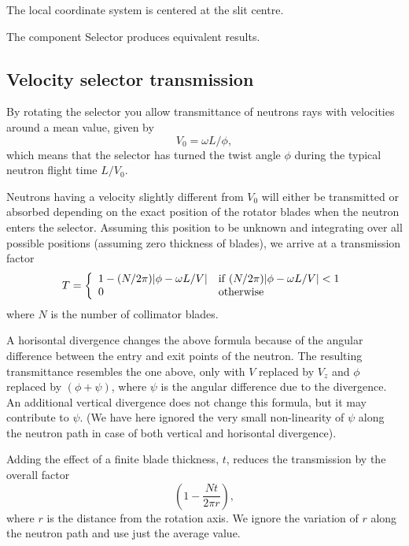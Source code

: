 The local coordinate system is centered at the slit centre.

The component {\rm Selector} produces equivalent results.

\subsection{Velocity selector transmission}
By rotating the selector you allow
transmittance of neutrons rays with velocities around a mean value, given by
\begin{equation}
V_0 = \omega L / \phi ,
\end{equation}
which means that the selector has turned the twist angle
$\phi$ during the typical neutron flight time $L/V_0$.

Neutrons having a velocity slightly different from $V_0$
will either be transmitted or absorbed depending on the exact position
of the rotator blades when the neutron enters the selector.
Assuming this position to be unknown and integrating over all possible
positions (assuming zero thickness of blades), we arrive at a transmission factor
\begin{equation}
T = \left\{
 \begin{array}{ll}
 1 - (N/2\pi ) |\phi-\omega L / V| &
        {\rm if}\;   (N/2\pi )|\phi -\omega L / V| < 1 \\
    0  &  {\rm otherwise}
 \end{array} \right.
\end{equation}
where $N$ is the number of collimator blades.

A horisontal divergence changes the above formula because of the
angular difference between the entry and exit points of the neutron.
The resulting transmittance resembles the one above, only with
$V$ replaced by $V_z$ and $\phi$ replaced by $(\phi +\psi )$,
where $\psi$ is the angular difference due to
the divergence. An additional vertical divergence does not change
this formula, but it may contribute to $\psi$.
(We have here ignored the very small non-linearity of $\psi$ along the
neutron path in case of both vertical and horisontal divergence).

Adding the effect of a finite blade thickness, $t$, reduces the transmission
by the overall factor
\begin{equation}
\left( 1-\frac{N t}{2\pi r}  \right),
\end{equation}
where $r$ is the distance from the rotation axis. We ignore the variation
of $r$ along the neutron path and use just the average value.


